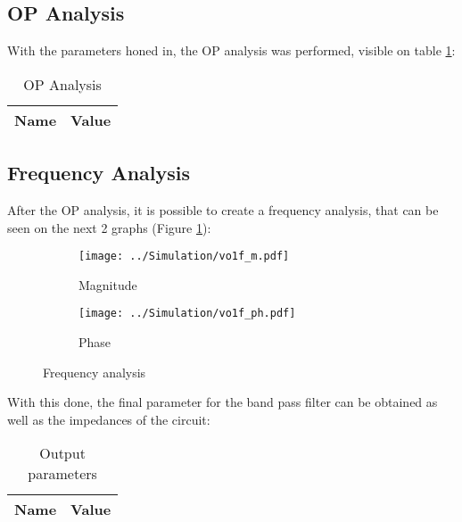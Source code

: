  
\subsection{OP Analysis}

\indent

With the parameters honed in, the OP analysis was performed, visible on table \ref{tab:OP_ngs}:

\begin{table}[H]
  \centering
  \begin{tabular}{|l|r|}
    \hline    
    {\bf Name} & {\bf Value} \\ \hline
    
  \end{tabular}
  \caption{OP Analysis}
  \label{tab:OP_ngs}
\end{table}

\subsection{Frequency Analysis}

\indent

After the OP analysis, it is possible to create a frequency analysis, that can be seen on the next 2 graphs (Figure \ref{fig:FreqANGS}):

\begin{figure}[H]
\centering
\begin{subfigure}{.49\textwidth}
  \centering
  \texttt{[image: ../Simulation/vo1f\_m.pdf]}
  \caption{Magnitude}
\end{subfigure}%
\begin{subfigure}{.49\textwidth}
  \centering
  \texttt{[image: ../Simulation/vo1f\_ph.pdf]}
  \caption{Phase}
\end{subfigure}
\caption{Frequency analysis}
\label{fig:FreqANGS}
\end{figure}


With this done, the final parameter for the band pass filter can be obtained as well as the impedances of the circuit:

\begin{table}[H]
  \centering
  \begin{tabular}{|l|r|}
    \hline    
    {\bf Name} & {\bf Value} \\ \hline
  \end{tabular}
  \caption{Output parameters}
  \label{tab: OutputParamNGS}
\end{table}


